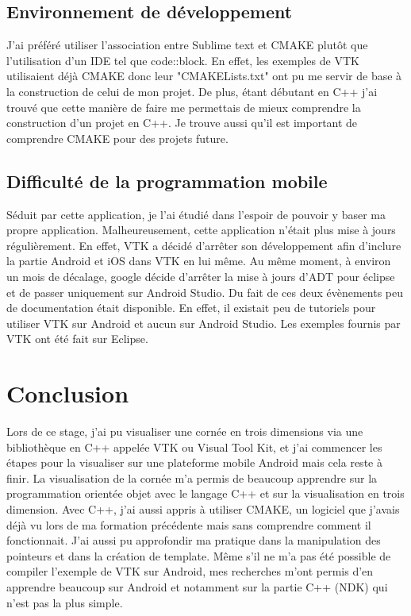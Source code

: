 \documentclass[a4paper,12pt]{article}
\begin{document}
	 \subsection{Environnement de développement}
J'ai préféré utiliser l'association entre Sublime text et CMAKE plut\^ot que l'utilisation d'un IDE tel que code::block. En effet, les exemples de VTK utilisaient déjà CMAKE donc leur "CMAKELists.txt" ont pu me servir de base à la construction de celui de mon projet. De plus, étant débutant en C++ j'ai trouvé que cette manière de faire me permettais de mieux comprendre la construction d'un projet en C++. Je trouve aussi qu'il est important de comprendre CMAKE pour des projets future.

	\subsection{Difficulté de la programmation mobile}
	 Séduit par cette application, je l'ai étudié dans l'espoir de pouvoir y baser ma propre application. Malheureusement, cette application n'était plus mise à jours régulièrement. En effet, VTK a décidé d'arrêter son développement afin d'inclure la partie Android et iOS dans VTK en lui même. Au même moment, à environ un mois de décalage, google décide d'arrêter la mise à jours d'ADT pour éclipse et de passer uniquement sur Android Studio. Du fait de ces deux évènements peu de documentation était disponible. En effet, il existait peu de tutoriels pour utiliser VTK sur Android et aucun sur Android Studio. Les exemples fournis par VTK ont été fait sur Eclipse.
	 
\newpage
\section{Conclusion}
Lors de ce stage, j'ai pu visualiser une cornée en trois dimensions via une bibliothèque en C++ appelée VTK ou Visual Tool Kit, et j'ai commencer les étapes pour la visualiser sur une plateforme mobile Android mais cela reste à finir. La visualisation de la cornée m'a permis de beaucoup apprendre sur la programmation orientée objet avec le langage C++ et sur la visualisation en trois dimension. Avec C++, j'ai aussi appris à utiliser CMAKE, un logiciel que j'avais déjà vu lors de ma formation précédente mais sans comprendre comment il fonctionnait. J'ai aussi pu approfondir ma pratique dans la manipulation des pointeurs et dans la création de template. Même s'il ne m'a pas été possible de compiler l'exemple de VTK sur Android, mes recherches m'ont permis d'en apprendre beaucoup sur Android et notamment sur la partie C++ (NDK) qui n'est pas la plus simple.
\end{document}
